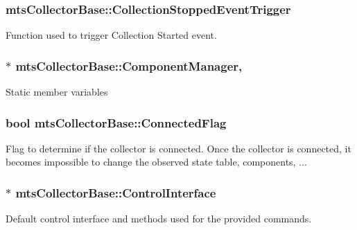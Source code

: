 \subsubsection[{Collection\+Stopped\+Event\+Trigger}]{ mts\+Collector\+Base\+::\+Collection\+Stopped\+Event\+Trigger}\label{classmts_collector_base_a8caa04305488581107b1ad19087079a2}
Function used to trigger Collection Started event. \hypertarget{classmts_collector_base_a5d4cca6b7e903dec79a349efc63ba8a0}{}
\subsubsection[{Component\+Manager}]{$\ast$ mts\+Collector\+Base\+::\+Component\+Manager\hspace{0.3cm}{\ttfamily [static]}, {\ttfamily [protected]}}\label{classmts_collector_base_a5d4cca6b7e903dec79a349efc63ba8a0}
Static member variables \hypertarget{classmts_collector_base_a68e1ba8a88b403471103ad596fd3f002}{}
\subsubsection[{Connected\+Flag}]{\setlength{\rightskip}{0pt plus 5cm}bool mts\+Collector\+Base\+::\+Connected\+Flag\hspace{0.3cm}{\ttfamily [protected]}}\label{classmts_collector_base_a68e1ba8a88b403471103ad596fd3f002}
Flag to determine if the collector is connected. Once the collector is connected, it becomes impossible to change the observed state table, components, ... \hypertarget{classmts_collector_base_abfd24852cb33dc25956b49ed2896ac10}{}
\subsubsection[{Control\+Interface}]{$\ast$ mts\+Collector\+Base\+::\+Control\+Interface\hspace{0.3cm}{\ttfamily [protected]}}\label{classmts_collector_base_abfd24852cb33dc25956b49ed2896ac10}
Default control interface and methods used for the provided commands. \hypertarget{classmts_collector_base_a7d711ebe23e8573509789daa9e7392e6}{}
